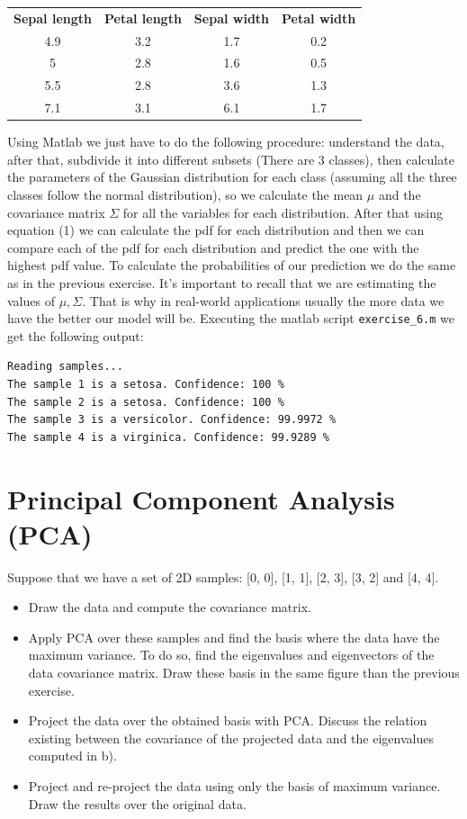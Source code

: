 \documentclass[]{article}
\begin{document}
\begin{center}
	\begin{tabular}{c | c | c | c}
		\textbf{Sepal length} 	& \textbf{Petal length} 	& \textbf{Sepal width} 	& \textbf{Petal width}\\
		4.9				& 3.2			& 1.7			& 0.2\\
		5				& 2.8			& 1.6 			& 0.5\\
		5.5				& 2.8			& 3.6			& 1.3\\
		7.1				& 3.1			& 6.1			& 1.7\\
	\end{tabular}
\end{center}

Using Matlab we just have to do the following procedure: understand the data, after that, subdivide it into different subsets (There are 3 classes), then calculate the parameters of the Gaussian distribution for each class (assuming all the three classes follow the normal distribution), so we calculate the mean $\mu$ and the covariance matrix $\Sigma$ for all the variables for each distribution. After that using equation (1) we can calculate the pdf for each distribution and then we can compare each of the pdf for each distribution and predict the one with the highest pdf value. To calculate the probabilities of our prediction we do the same as in the previous exercise. It's important to recall that we are estimating the values of $\mu, \Sigma$. That is why in real-world applications usually the more data we have the better our model will be. Executing the matlab script \texttt{exercise\_6.m} we get the following output:

\begin{verbatim}
Reading samples...
The sample 1 is a setosa. Confidence: 100 %
The sample 2 is a setosa. Confidence: 100 %
The sample 3 is a versicolor. Confidence: 99.9972 %
The sample 4 is a virginica. Confidence: 99.9289 %
\end{verbatim}
\pagebreak
\section{Principal Component Analysis (PCA)}
Suppose that we have a set of 2D samples: [0, 0], [1, 1], [2, 3], [3, 2] and [4, 4].
\begin{itemize}
	\item Draw the data and compute the covariance matrix.
	\item Apply PCA over these samples and find the basis where the data have the maximum variance. To do so, find the eigenvalues and eigenvectors of the data covariance matrix. Draw these basis in the same figure than the previous exercise.
	\item Project the data over the obtained basis with PCA. Discuss the relation existing between the covariance of the projected data and the eigenvalues computed in b).
	\item Project and re-project the data using only the basis of maximum variance. Draw the results over the original data.
\end{itemize}
\end{document}
